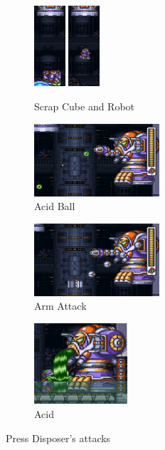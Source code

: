 \begin{figure}[htp]
	\centering
	\begin{subfigure}{\linewidth}
		\centering
		\includegraphics[height=3cm]{figures/X3/Doppler_stages/press_scrap_1.jpg}
		\includegraphics[height=3cm]{figures/X3/Doppler_stages/press_scrap_2.jpg}
		\caption{Scrap Cube and Robot}
	\end{subfigure}
	\begin{subfigure}{.4\linewidth}
		\centering
		\includegraphics[height=2.7cm]{figures/X3/Doppler_stages/press_acid.jpg}
		\caption{Acid Ball}
	\end{subfigure}
	\begin{subfigure}{.4\linewidth}
		\centering
		\includegraphics[height=2.7cm]{figures/X3/Doppler_stages/press_arm.jpg}
		\caption{Arm Attack}
	\end{subfigure}
	\begin{subfigure}{.4\linewidth}
		\centering
		\includegraphics[height=3cm]{figures/X3/Doppler_stages/press_flood.jpg}
		\caption{Acid}
	\end{subfigure}
	\caption{Press Disposer's attacks}
\end{figure}
